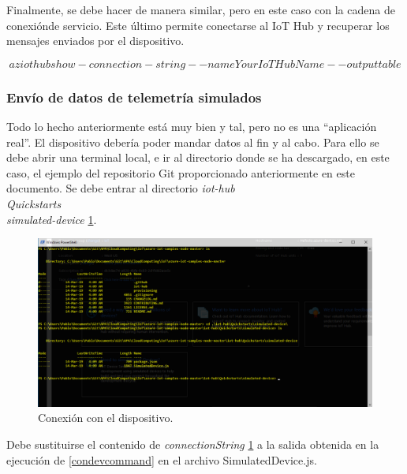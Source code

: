 \documentclass[10pt]{article}
\begin{document}
Finalmente, se debe hacer de manera similar, pero en este caso con la cadena de
conexiónde servicio. Este último permite conectarse al IoT Hub y recuperar los
mensajes enviados por el dispositivo.

\begin{equation}
 \label{consercommand}
az iot hub show-connection-string --name YourIoTHubName --output table
\end{equation}

\subsubsection{Envío de datos de telemetría simulados}

Todo lo hecho anteriormente está muy bien y tal\ldtos, pero no es una
``aplicación real''. El dispositivo debería poder mandar datos al fin y al cabo.
Para ello se debe abrir una terminal local, e ir al directorio donde se ha
descargado, en este caso, el ejemplo del repositorio Git proporcionado
anteriormente en este documento. Se debe entrar al directorio
\textit{iot-hub\\Quickstarts\\simulated-device}
\hyperref[directory]{\ref{directory}}.

\begin{figure}[h!]
 \includegraphics[width=\linewidth]{./IoT/MicrosoftAzure/4-1_send_simulated_telemetry.png}
 \caption{Conexión con el dispositivo.}
 \label{directory}
\end{figure}

Debe sustituirse el contenido de \textit{connectionString}
\hyperref[directory]{\ref{directory}} a la salida obtenida en la ejecución de 
\hyperref[condevcommand]{\ref{condevcommand}} en el archivo SimulatedDevice.js.
\end{document}
